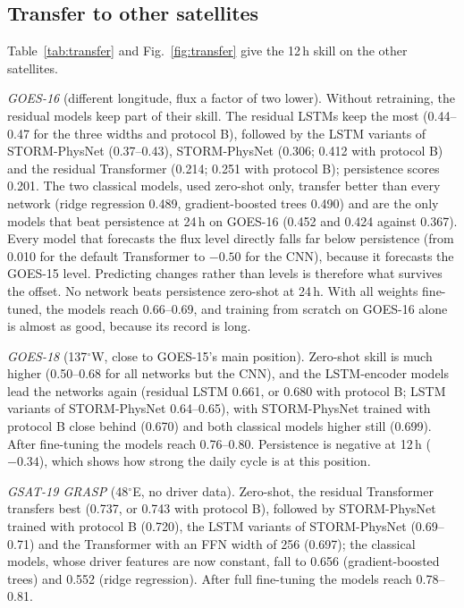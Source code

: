 \documentclass[a4paper,fleqn]{cas-dc}
\begin{document}
\subsection{Transfer to other satellites}
\label{sec:transfer}
Table~\ref{tab:transfer} and Fig.~\ref{fig:transfer} give the 12\,h skill on the other satellites.

\emph{GOES-16} (different longitude, flux a factor of two lower). Without retraining, the residual models keep
part of their skill. The residual LSTMs keep the most (0.44--0.47 for the three widths and protocol B), followed by the LSTM variants of
STORM-PhysNet (0.37--0.43), STORM-PhysNet (0.306; 0.412 with protocol B) and the residual Transformer (0.214; 0.251
with protocol B); persistence scores 0.201. The two
classical models, used zero-shot only, transfer better than every network (ridge regression 0.489, gradient-boosted
trees 0.490) and are the only models that beat persistence at 24\,h on GOES-16 (0.452 and 0.424 against 0.367). Every model that forecasts the flux level directly falls far below persistence
(from 0.010 for the default Transformer to \(-0.50\) for the CNN), because it forecasts the GOES-15 level.
Predicting changes rather than levels is therefore what survives the offset. No network beats persistence
zero-shot at 24\,h. With all weights fine-tuned, the models reach 0.66--0.69, and training from scratch on
GOES-16 alone is almost as good, because its record is long.

\emph{GOES-18} (137\(^\circ\)W, close to GOES-15's main position). Zero-shot skill is much higher (0.50--0.68 for all networks but the CNN), and
the LSTM-encoder models lead the networks again (residual LSTM 0.661, or 0.680 with protocol B; LSTM variants of
STORM-PhysNet 0.64--0.65), with STORM-PhysNet trained with protocol B close behind (0.670) and both classical models
higher still (0.699). After fine-tuning the models reach 0.76--0.80. Persistence is negative at
12\,h (\(-0.34\)), which shows how strong the daily cycle is at this position.

\emph{GSAT-19 GRASP} (48\(^\circ\)E, no driver data). Zero-shot, the residual Transformer transfers best
(0.737, or 0.743 with protocol B), followed by STORM-PhysNet trained with protocol B (0.720), the LSTM variants of
STORM-PhysNet (0.69--0.71) and the Transformer with an FFN width of 256 (0.697); the classical
models, whose driver features are now constant, fall to 0.656 (gradient-boosted trees) and 0.552 (ridge regression). After full fine-tuning the models reach
0.78--0.81.
\end{document}
